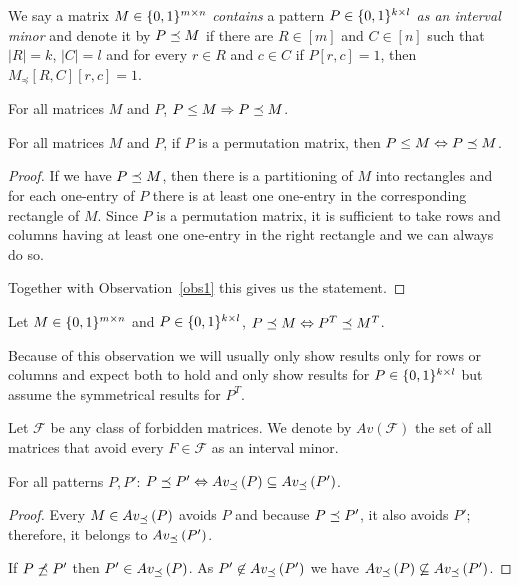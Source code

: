 \begin{defn}
We say a matrix $M\in\{0,1\}^{m\times n}$ \emph{contains} a pattern $P\in\{0,1\}^{k\times l}$ \emph{as an interval minor} and denote it by $P\preceq M$ if there are $R\in[m]$ and $C\in[n]$ such that $|R|=k$, $|C|=l$ and for every $r\in R$ and $c\in C$ if $P[r,c]=1$, then $M_{\preceq}[R,C][r,c]=1$.
\end{defn}
%
%
%
\begin{obs}
\label{obs1}
For all matrices $M$ and $P$, $P\leq M\Rightarrow P\preceq M$.
\end{obs}
\begin{obs}
For all matrices $M$ and $P$, if $P$ is a permutation matrix, then $P\leq M\Leftrightarrow P\preceq M$.
\end{obs}
\begin{proof}
If we have $P\preceq M$, then there is a partitioning of $M$ into rectangles and for each one-entry of $P$ there is at least one one-entry in the corresponding rectangle of $M$. Since $P$ is a permutation matrix, it is sufficient to take rows and columns having at least one one-entry in the right rectangle and we can always do so.

Together with Observation~\ref{obs1} this gives us the statement.
\end{proof}
\begin{obs}
Let $M\in\{0,1\}^{m\times n}$ and $P\in\{0,1\}^{k\times l}$, $P\preceq M\Leftrightarrow P^T\preceq M^T$.
\end{obs}
Because of this observation we will usually only show results only for rows or columns and expect both to hold and only show results for $P\in\{0,1\}^{k\times l}$ but assume the symmetrical results for $P^T$.

\begin{defn}
Let $\mathcal{F}$ be any class of forbidden matrices. We denote by $Av(\mathcal{F})$ the set of all matrices that avoid every $F\in\mathcal{F}$ as an interval minor.
\end{defn}
\begin{obs}
For all patterns $P,P'$: $P\preceq P'\Leftrightarrow Av_{\preceq}\left(P\right)\subseteq Av_{\preceq}\left(P'\right)$.
\end{obs}
\begin{proof}
Every $M\in Av_{\preceq}\left(P\right)$ avoids $P$ and because $P\preceq P'$, it also avoids $P'$; therefore, it belongs to $Av_{\preceq}\left(P'\right)$.

If $P\not\preceq P'$ then $P'\in Av_{\preceq}\left(P\right)$. As $P'\not\in Av_{\preceq}\left(P'\right)$ we have $Av_{\preceq}\left(P\right)\not\subseteq Av_{\preceq}\left(P'\right)$.
\end{proof}

